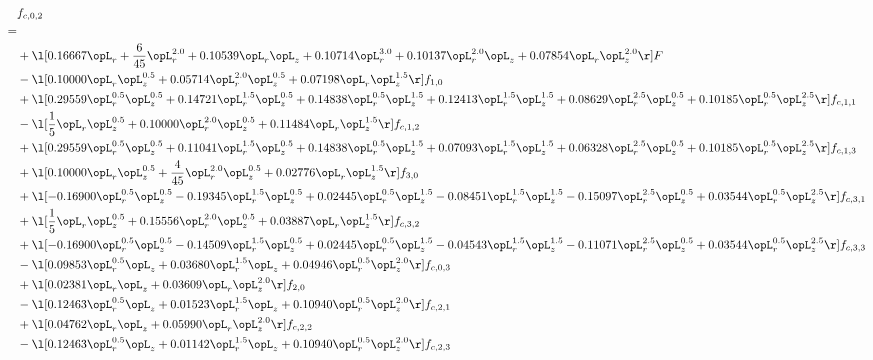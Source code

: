 \begin{alignat}{2} 
\label{eq:f_02_2} 
& f_{c,0,2} \nonumber \\ 
 = \\ 
& + \l[  0.16667 \opL_r + \frac{6}{45} \opL_r^{2.0} +  0.10539 \opL_r \opL_z +  0.10714 \opL_r^{3.0} +  0.10137 \opL_r^{2.0} \opL_z +  0.07854 \opL_r \opL_z^{2.0}  \r] F \nonumber \\ 
& - \l[  0.10000 \opL_r \opL_z^{0.5} +  0.05714 \opL_r^{2.0} \opL_z^{0.5} +  0.07198 \opL_r \opL_z^{1.5}  \r] f_{1,0} \nonumber \\ 
& + \l[  0.29559 \opL_r^{0.5} \opL_z^{0.5} +  0.14721 \opL_r^{1.5} \opL_z^{0.5} +  0.14838 \opL_r^{0.5} \opL_z^{1.5} +  0.12413 \opL_r^{1.5} \opL_z^{1.5} +  0.08629 \opL_r^{2.5} \opL_z^{0.5} +  0.10185 \opL_r^{0.5} \opL_z^{2.5}  \r] f_{c,1,1} \nonumber \\ 
& - \l[ \frac{1}{5} \opL_r \opL_z^{0.5} +  0.10000 \opL_r^{2.0} \opL_z^{0.5} +  0.11484 \opL_r \opL_z^{1.5}  \r] f_{c,1,2} \nonumber \\ 
& + \l[  0.29559 \opL_r^{0.5} \opL_z^{0.5} +  0.11041 \opL_r^{1.5} \opL_z^{0.5} +  0.14838 \opL_r^{0.5} \opL_z^{1.5} +  0.07093 \opL_r^{1.5} \opL_z^{1.5} +  0.06328 \opL_r^{2.5} \opL_z^{0.5} +  0.10185 \opL_r^{0.5} \opL_z^{2.5}  \r] f_{c,1,3} \nonumber \\ 
& + \l[  0.10000 \opL_r \opL_z^{0.5} + \frac{4}{45} \opL_r^{2.0} \opL_z^{0.5} +  0.02776 \opL_r \opL_z^{1.5}  \r] f_{3,0} \nonumber \\ 
& + \l[  -0.16900 \opL_r^{0.5} \opL_z^{0.5}   -0.19345 \opL_r^{1.5} \opL_z^{0.5} +  0.02445 \opL_r^{0.5} \opL_z^{1.5}   -0.08451 \opL_r^{1.5} \opL_z^{1.5}   -0.15097 \opL_r^{2.5} \opL_z^{0.5} +  0.03544 \opL_r^{0.5} \opL_z^{2.5}  \r] f_{c,3,1} \nonumber \\ 
& + \l[ \frac{1}{5} \opL_r \opL_z^{0.5} +  0.15556 \opL_r^{2.0} \opL_z^{0.5} +  0.03887 \opL_r \opL_z^{1.5}  \r] f_{c,3,2} \nonumber \\ 
& + \l[  -0.16900 \opL_r^{0.5} \opL_z^{0.5}   -0.14509 \opL_r^{1.5} \opL_z^{0.5} +  0.02445 \opL_r^{0.5} \opL_z^{1.5}   -0.04543 \opL_r^{1.5} \opL_z^{1.5}   -0.11071 \opL_r^{2.5} \opL_z^{0.5} +  0.03544 \opL_r^{0.5} \opL_z^{2.5}  \r] f_{c,3,3} \nonumber \\ 
& - \l[  0.09853 \opL_r^{0.5} \opL_z +  0.03680 \opL_r^{1.5} \opL_z +  0.04946 \opL_r^{0.5} \opL_z^{2.0}  \r] f_{c,0,3} \nonumber \\ 
& + \l[  0.02381 \opL_r \opL_z +  0.03609 \opL_r \opL_z^{2.0}  \r] f_{2,0} \nonumber \\ 
& - \l[  0.12463 \opL_r^{0.5} \opL_z +  0.01523 \opL_r^{1.5} \opL_z +  0.10940 \opL_r^{0.5} \opL_z^{2.0}  \r] f_{c,2,1} \nonumber \\ 
& + \l[  0.04762 \opL_r \opL_z +  0.05990 \opL_r \opL_z^{2.0}  \r] f_{c,2,2} \nonumber \\ 
& - \l[  0.12463 \opL_r^{0.5} \opL_z +  0.01142 \opL_r^{1.5} \opL_z +  0.10940 \opL_r^{0.5} \opL_z^{2.0}  \r] f_{c,2,3} \nonumber \\ 
\end{alignat} 


